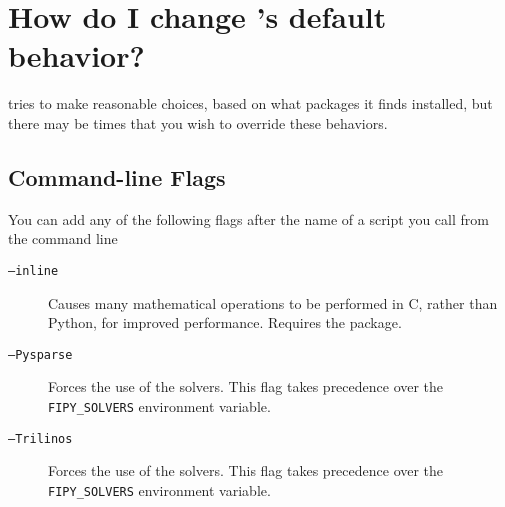    \section{How do I change \FiPy{}'s default behavior?}
        \label{FAQ-FlagsAndEnvironmentVariables}
        \FiPy{} tries to make reasonable choices, based on what 
        packages it finds installed, but there may be times that you 
        wish to override these behaviors. 
        \subsection{Command-line Flags}
        You can add any of the following flags after the name of a 
        script you call from the command line
        \begin{description}
            \item[\texttt{--inline}] Causes many mathematical
            operations to be performed in C, rather than Python, for
            improved performance. Requires the \SciPy{} \weave{}
            package. 

            \item[\texttt{--Pysparse}] Forces the use of the 
            \Trilinos{} solvers. This flag takes precedence over the 
            \texttt{FIPY\_SOLVERS} environment variable.

            \item[\texttt{--Trilinos}] Forces the use of the 
            \Trilinos{} solvers. This flag takes precedence over the 
            \texttt{FIPY\_SOLVERS} environment variable.
        \end{description}
        
